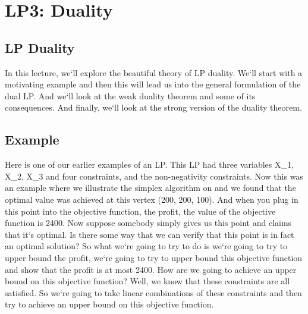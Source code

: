 \section{LP3: Duality}

\subsection{LP Duality}
In this lecture, we`ll explore the beautiful theory of LP duality.
We`ll start with a motivating example and then this will lead us into the general formulation of the dual LP\@.
And we`ll look at the weak duality theorem and some of its consequences.
And finally, we`ll look at the strong version of the duality theorem.

\subsection{Example}
Here is one of our earlier examples of an LP\@.
This LP had three variables X\_1, X\_2, X\_3 and four constraints, and the non-negativity constraints.
Now this was an example where we illustrate the simplex algorithm on and we found that the optimal value was achieved at this vertex (200, 200, 100).
And when you plug in this point into the objective function, the profit, the value of the objective function is 2400.
Now suppose somebody simply gives us this point and claims that it`s optimal.
Is there some way that we can verify that this point is in fact an optimal solution? So what we`re going to try to do is we`re going to try to upper bound the profit, we`re going to try to upper bound this objective function and show that the profit is at most 2400.
How are we going to achieve an upper bound on this objective function? Well, we know that these constraints are all satisfied.
So we`re going to take linear combinations of these constraints and then try to achieve an upper bound on this objective function.


